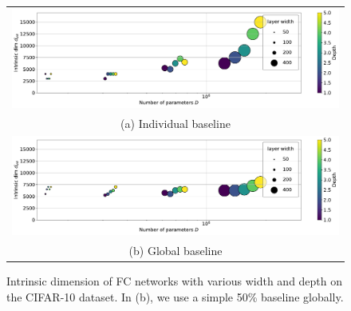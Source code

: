 \documentclass{article} %
\begin{document}
%
\begin{figure}[t!] \centering
	\vspace{-5mm}
	\begin{tabular}{c}
		\hspace{-0mm}
		\includegraphics[width=13.4cm]{fnn_cifar_dim_local}
		\\          
		(a) Individual baseline		\\
		\hspace{-0mm}
		\includegraphics[width=13.4cm]{fnn_cifar_dim_global}
		\\       
		(b) Global baseline 
	\end{tabular} \vspace{-2mm}
	\caption{Intrinsic dimension of FC networks with various width and depth on the CIFAR-10 dataset. In (b), we use a simple 50\% baseline globally.}
	\label{fig:fnn_cifar_dim}
	\vspace{-3mm}
\end{figure}
\end{document}

